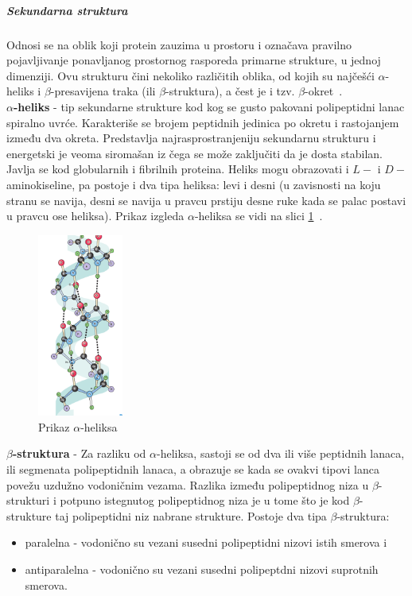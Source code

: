\subparagraph{Sekundarna struktura}
Odnosi se na oblik koji protein zauzima u prostoru i označava pravilno pojavljivanje ponavljanog prostornog rasporeda primarne strukture, u jednoj dimenziji. Ovu strukturu čini nekoliko različitih oblika, od kojih su najčešći $\alpha$-heliks i $\beta$-presavijena traka (ili $\beta$-struktura), a čest je i tzv. $\beta$-okret~\cite{spasic,medbio}.\\
\textbf{$\alpha$-heliks} - tip sekundarne strukture kod kog se gusto pakovani polipeptidni lanac spiralno uvrće. Karakteriše se brojem peptidnih jedinica po okretu i rastojanjem između dva okreta. Predstavlja najrasprostranjeniju sekundarnu strukturu i energetski je veoma siromašan iz čega se može zaključiti da je dosta stabilan. Javlja se kod globularnih i fibrilnih proteina. Heliks mogu obrazovati i $L-$ i $D-$ aminokiseline, pa postoje i dva tipa heliksa: levi i desni (u zavisnosti na koju stranu se navija, desni se navija u pravcu prstiju desne ruke kada se palac postavi u pravcu ose heliksa). Prikaz izgleda $\alpha$-heliksa se vidi na slici \ref{fig:aheliks}~\cite{spasic, Principi}.
\begin{figure}[H]
	\centering
    \includegraphics[width=0.25\textwidth]{Figures/BO/ahelix.png}
    \caption{Prikaz $\alpha$-heliksa~\cite{bmbg}}
    \label{fig:aheliks}
\end{figure}
\textbf{$\beta$-struktura} - Za razliku od $\alpha$-heliksa, sastoji se od dva ili više peptidnih lanaca, ili segmenata polipeptidnih lanaca, a obrazuje se kada se ovakvi tipovi lanca povežu uzdužno vodoničnim vezama. Razlika između polipeptidnog niza u  $\beta$-strukturi i potpuno istegnutog polipeptidnog niza je u tome što je kod  $\beta$-strukture taj polipeptidni niz nabrane strukture. Postoje dva tipa $\beta$-struktura: 
\begin{itemize}
\item paralelna - vodonično su vezani susedni polipeptidni nizovi istih smerova  i 
\item antiparalelna - vodonično su vezani susedni polipeptdni nizovi suprotnih smerova. 
\end{itemize}
